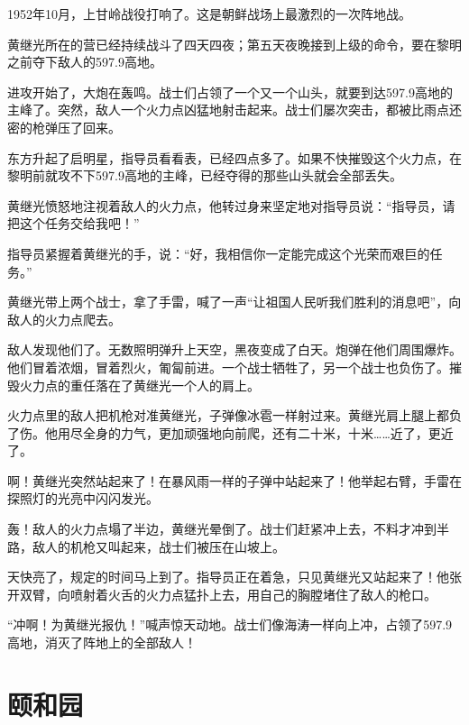 \documentclass[12pt,UTF-8,openany]{ctexbook}
\begin{document}
\begin{Large}
    
    1952年10月，上甘岭战役打响了。这是朝鲜战场上最激烈的一次阵地战。
    
    黄继光所在的营已经持续战斗了四天四夜；第五天夜晚接到上级的命令，要在黎明之前夺下敌人的597.9高地。
    
    进攻开始了，大炮在轰鸣。战士们占领了一个又一个山头，就要到达597.9高地的主峰了。突然，敌人一个火力点凶猛地射击起来。战士们屡次突击，都被比雨点还密的枪弹压了回来。
    
    东方升起了启明星，指导员看看表，已经四点多了。如果不快摧毁这个火力点，在黎明前就攻不下597.9高地的主峰，已经夺得的那些山头就会全部丢失。
    
    黄继光愤怒地注视着敌人的火力点，他转过身来坚定地对指导员说：“指导员，请把这个任务交给我吧！”
    
    指导员紧握着黄继光的手，说：“好，我相信你一定能完成这个光荣而艰巨的任务。”
    
    黄继光带上两个战士，拿了手雷，喊了一声“让祖国人民听我们胜利的消息吧”，向敌人的火力点爬去。
    
    敌人发现他们了。无数照明弹升上天空，黑夜变成了白天。炮弹在他们周围爆炸。他们冒着浓烟，冒着烈火，匍匐前进。一个战士牺牲了，另一个战士也负伤了。摧毁火力点的重任落在了黄继光一个人的肩上。
    
    火力点里的敌人把机枪对准黄继光，子弹像冰雹一样射过来。黄继光肩上腿上都负了伤。他用尽全身的力气，更加顽强地向前爬，还有二十米，十米……近了，更近了。
    
    啊！黄继光突然站起来了！在暴风雨一样的子弹中站起来了！他举起右臂，手雷在探照灯的光亮中闪闪发光。
    
    轰！敌人的火力点塌了半边，黄继光晕倒了。战士们赶紧冲上去，不料才冲到半路，敌人的机枪又叫起来，战士们被压在山坡上。
    
    天快亮了，规定的时间马上到了。指导员正在着急，只见黄继光又站起来了！他张开双臂，向喷射着火舌的火力点猛扑上去，用自己的胸膛堵住了敌人的枪口。
    
    “冲啊！为黄继光报仇！”喊声惊天动地。战士们像海涛一样向上冲，占领了597.9高地，消灭了阵地上的全部敌人！
    
\end{Large}

\chapter{颐和园}
\end{document}
